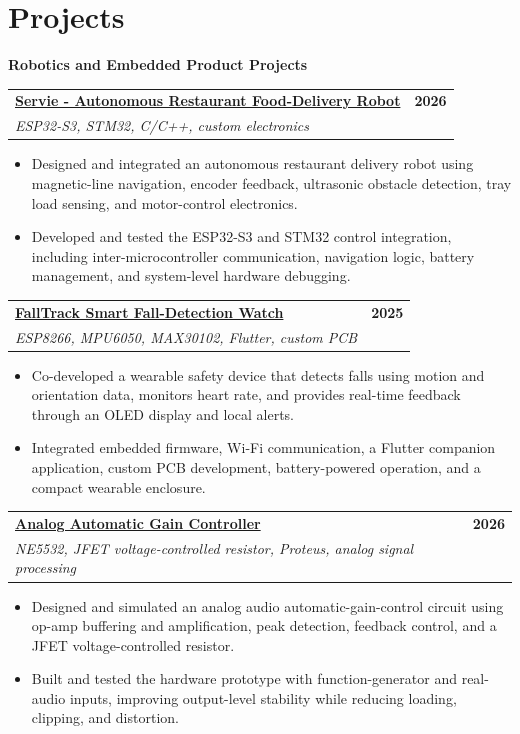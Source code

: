\documentclass[a4paper,10pt]{article}
\makeatletter
\newcommand{\projectEntry}[3]{%
  \Needspace{9\baselineskip}%
  \begin{tabularx}{\textwidth}{@{}Xr@{}}
    \textbf{#1} & \textbf{\small #3} \\
    {\small\textit{#2}} &
  \end{tabularx}
  \vspace{0.35mm}
}
\newcommand{\projectCategory}[1]{%
  \vspace{1.0mm}
  {\normalsize\bfseries\color{accent} #1}\par
  \vspace{0.75mm}
}
\makeatother
\begin{document}
\section{Projects}

\projectCategory{Robotics and Embedded Product Projects}

\projectEntry
  {\href{https://github.com/hakammra/Restaurent-Robot}{Servie - Autonomous Restaurant Food-Delivery Robot \faGithub}}
  {ESP32-S3, STM32, C/C++, custom electronics}
  {2026}
\begin{itemize}
  \item Designed and integrated an autonomous restaurant delivery robot using magnetic-line navigation, encoder feedback, ultrasonic obstacle detection, tray load sensing, and motor-control electronics.
  \item Developed and tested the ESP32-S3 and STM32 control integration, including inter-microcontroller communication, navigation logic, battery management, and system-level hardware debugging.
\end{itemize}
\vspace{1.35mm}

\projectEntry
  {\href{https://github.com/hakammra/falltrack-watch}{FallTrack Smart Fall-Detection Watch \faGithub}}
  {ESP8266, MPU6050, MAX30102, Flutter, custom PCB}
  {2025}
\begin{itemize}
  \item Co-developed a wearable safety device that detects falls using motion and orientation data, monitors heart rate, and provides real-time feedback through an OLED display and local alerts.
  \item Integrated embedded firmware, Wi-Fi communication, a Flutter companion application, custom PCB development, battery-powered operation, and a compact wearable enclosure.
\end{itemize}
\vspace{1.35mm}

\projectEntry
  {\href{https://github.com/hakammra/automatic-gain-controller}{Analog Automatic Gain Controller \faGithub}}
  {NE5532, JFET voltage-controlled resistor, Proteus, analog signal processing}
  {2026}
\begin{itemize}
  \item Designed and simulated an analog audio automatic-gain-control circuit using op-amp buffering and amplification, peak detection, feedback control, and a JFET voltage-controlled resistor.
  \item Built and tested the hardware prototype with function-generator and real-audio inputs, improving output-level stability while reducing loading, clipping, and distortion.
\end{itemize}
\vspace{1.35mm}
\end{document}
